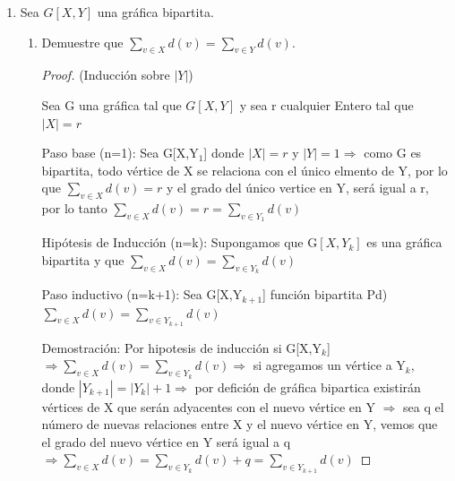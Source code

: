 \documentclass{article}
\begin{document}
\begin{enumerate}
\begin{enumerate}
\begin{proof}
      Ahora notemos que, en $Y$ están todos los subconjuntos de
      $BL_n$  que tienen cardinalidad impar. Por lo tanto, la
      diferencia simétrica en cualesquiera dos subconjuntos
      distintos en $Y$ es:
      \begin{itemize}
      \item[-] Al menos un conjunto de cardinalidad $2$.
      \end{itemize}
      Entonces tenemos que: $2k + 1 - (2k -1) = 2$ y como $Y$
      es un conjunto, no se tiene dos conjuntos iguales a los
      cuales relacionar. Por lo anterior y por la definición de
      diferencia simétrica, no existen dos conjuntos adyacentes
      en $Y$.
      
      \hspace*{3cm}  $\therefore$ \ \ \ $BL_n$ es bipartita en $X$ y $Y$, \textit{i.e.} $BL_n[X,Y]$
    \end{proof}
  \end{enumerate}
  
\item Sea $G[X, Y]$ una gr\'afica bipartita.
  \begin{enumerate}

  \item Demuestre que $\sum_{v \in X} d(v) = \sum_{v \in Y} d(v)$.
  \begin{proof}
    (Inducción sobre ${|Y|}$)
    
    Sea G una gráfica tal que $G[X,Y]$ y sea r cualquier Entero tal que $|X|=r$
    
    Paso base (n=1): Sea G[X,Y$_1$] donde $|X|=r$ y $|Y|=1 \Longrightarrow $ como G es bipartita, todo vértice de X se relaciona con el único elmento de Y, por lo que $\sum_{v \in X}d(v) = r $ y el grado del único vertice en Y, será igual a r, por lo tanto $\sum_{v \in X}d(v) = r = \sum_{v \in Y_1}d(v) $
    
    Hipótesis de Inducción (n=k): Supongamos que G$[X, Y_k]$ es una gráfica bipartita y que $\sum_{v \in X}d(v) = \sum_{v \in Y_k}d(v) $ 
    
    Paso inductivo (n=k+1): Sea G[X,Y$_{k+1}$] función bipartita Pd)  
    $ \sum_{v \in X} d(v) =  \sum_{v \in Y_{k+1}}d(v) $ 
    
    Demostración: Por hipotesis de inducción si  G[X,Y$_k$] $\Longrightarrow \sum_{v \in X}d(v) = \sum_{v \in Y_k}d(v) \Longrightarrow$ si agregamos un vértice a Y$_k$, donde $|Y_{k+1}|= |Y_k| +1 \Longrightarrow$ por defición de gráfica bipartica existirán vértices de X que serán adyacentes con el nuevo vértice en Y $\Longrightarrow$ sea q el número de nuevas relaciones entre X y el nuevo vértice en Y, vemos que el grado del nuevo vértice en Y será igual a q $\Longrightarrow \sum_{v \in X} d(v) = \sum_{v \in Y_k}d(v) + q =  \sum_{v \in Y_{k+1}}d(v) $ 
    

\end{proof}
\end{enumerate}
\end{enumerate}
\end{document}
